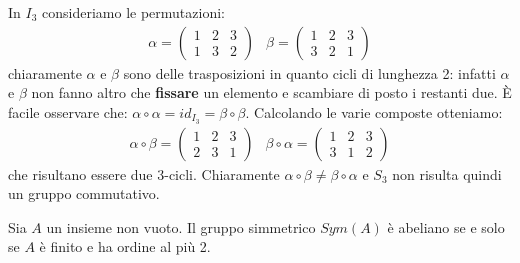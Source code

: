 \begin{example}
	In $I_{3}$ consideriamo le permutazioni:
	\begin{displaymath}
		\begin{array}{ll}
			\alpha = \left( \begin{array}{lll}
				1 & 2 & 3 \\
				1 & 3 & 2
			\end{array}
			\right) &
			\beta = \left( \begin{array}{lll}
				1 & 2 & 3 \\
				3 & 2 & 1
			\end{array}
			\right)
		\end{array}
	\end{displaymath}
	chiaramente $\alpha$ e $\beta$ sono delle trasposizioni in quanto cicli di lunghezza 2: infatti $\alpha$ e $\beta$ non fanno altro che  \textbf{fissare} un elemento e scambiare di posto i restanti due. È facile osservare che: $\alpha \circ \alpha = id_{I_{3}} = \beta \circ \beta$. Calcolando le varie composte otteniamo:
	\begin{displaymath}
		\begin{array}{ll}
			\alpha \circ \beta = \left(
			\begin{array}{lll}
				1 & 2 & 3 \\
				2 & 3 & 1
			\end{array}
			\right)
			&
			\beta \circ \alpha = \left(
			\begin{array}{lll}
				1 & 2 & 3 \\
				3 & 1 & 2
			\end{array}
			\right)
		\end{array}
	\end{displaymath}
	che risultano essere due 3-cicli. Chiaramente $\alpha \circ \beta \neq \beta \circ \alpha$ e $S_{3}$ non risulta quindi un gruppo commutativo.
\end{example}


\begin{teorbox}
	Sia $A$ un insieme non vuoto. Il gruppo simmetrico $Sym(A)$ è abeliano se e solo se $A$ è finito e ha ordine al più 2.
\end{teorbox}


